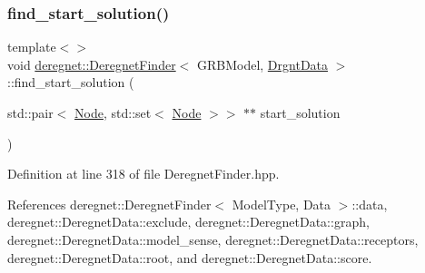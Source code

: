 \subsubsection{\texorpdfstring{find\+\_\+start\+\_\+solution()}{find\_start\_solution()}\hspace{0.1cm}{\footnotesize\ttfamily [2/3]}}
{\footnotesize\ttfamily template$<$$>$ \\
void \hyperlink{classderegnet_1_1DeregnetFinder}{deregnet\+::\+Deregnet\+Finder}$<$ G\+R\+B\+Model, \hyperlink{classderegnet_1_1DrgntData}{Drgnt\+Data} $>$\+::find\+\_\+start\+\_\+solution (\begin{DoxyParamCaption}\item[{std\+::pair$<$ \hyperlink{namespacederegnet_a744bad34f2de9856d36715a445f027f3}{Node}, std\+::set$<$ \hyperlink{namespacederegnet_a744bad34f2de9856d36715a445f027f3}{Node} $>$$>$ $\ast$$\ast$}]{start\+\_\+solution }\end{DoxyParamCaption})\hspace{0.3cm}{\ttfamily [inline]}}



Definition at line 318 of file Deregnet\+Finder.\+hpp.



References deregnet\+::\+Deregnet\+Finder$<$ Model\+Type, Data $>$\+::data, deregnet\+::\+Deregnet\+Data\+::exclude, deregnet\+::\+Deregnet\+Data\+::graph, deregnet\+::\+Deregnet\+Data\+::model\+\_\+sense, deregnet\+::\+Deregnet\+Data\+::receptors, deregnet\+::\+Deregnet\+Data\+::root, and deregnet\+::\+Deregnet\+Data\+::score.


